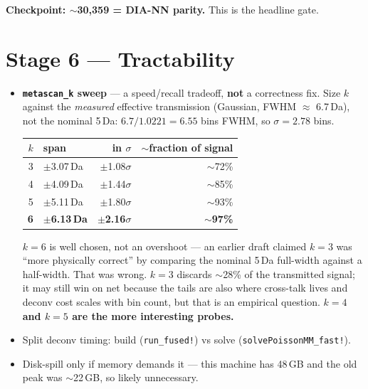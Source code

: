 \documentclass[11pt]{article}
\newcommand{\code}[1]{\texttt{\small #1}}
\begin{document}
\textbf{Checkpoint: $\sim$30,359 = DIA-NN parity.} This is the headline gate.

\section{Stage 6 --- Tractability}

\begin{itemize}[leftmargin=*,itemsep=0.2em]
  \item \textbf{\code{metascan\_k} sweep} --- a speed/recall tradeoff, \textbf{not} a correctness
        fix. Size $k$ against the \emph{measured} effective transmission (Gaussian,
        FWHM $\approx$ 6.7\,Da), not the nominal 5\,Da: $6.7/1.0221 = 6.55$ bins FWHM, so
        $\sigma = 2.78$ bins.

        \begin{center}
        \begin{tabular}{rlrr}
        \toprule
        $k$ & span & in $\sigma$ & $\sim$fraction of signal \\
        \midrule
        3 & $\pm$3.07\,Da & $\pm$1.08$\sigma$ & $\sim$72\% \\
        4 & $\pm$4.09\,Da & $\pm$1.44$\sigma$ & $\sim$85\% \\
        5 & $\pm$5.11\,Da & $\pm$1.80$\sigma$ & $\sim$93\% \\
        \textbf{6} & \textbf{$\pm$6.13\,Da} & \textbf{$\pm$2.16$\sigma$} & \textbf{$\sim$97\%} \\
        \bottomrule
        \end{tabular}
        \end{center}

        $k=6$ is well chosen, not an overshoot --- an earlier draft claimed $k=3$ was ``more
        physically correct'' by comparing the nominal 5\,Da full-width against a half-width. That
        was wrong. $k=3$ discards $\sim$28\% of the transmitted signal; it may still win on net
        because the tails are also where cross-talk lives and deconv cost scales with bin count,
        but that is an empirical question. \textbf{$k=4$ and $k=5$ are the more interesting
        probes.}
  \item Split deconv timing: build (\code{run\_fused!}) vs solve
        (\code{solvePoissonMM\_fast!}).
  \item Disk-spill only if memory demands it --- this machine has 48\,GB and the old peak was
        $\sim$22\,GB, so likely unnecessary.
\end{itemize}
\end{document}
